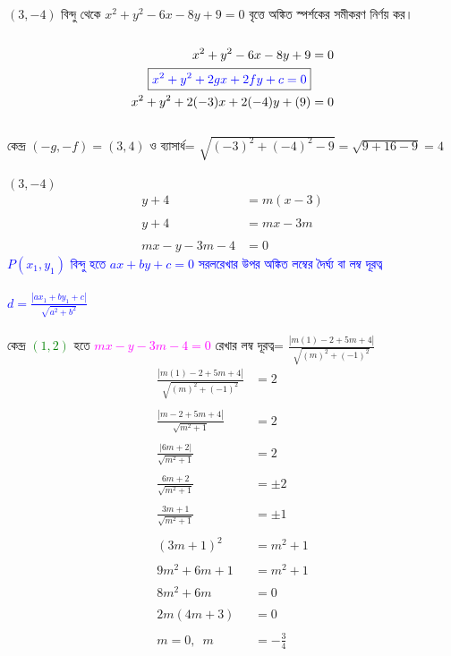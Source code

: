\documentclass{article}
\begin{document}
	\\ 
	$(3,-4)$ বিন্দু থেকে $x^2+y^2-6x-8y+9=0$ বৃত্তে অঙ্কিত স্পর্শকের সমীকরণ নির্ণয় কর। \\ 
	\\ 
	\begin{align*}
		x^2+y^2-6x-8y+9&=0\\
		\boxed{\textcolor{blue}{x^2+y^2+2gx+2fy+c=0}}&\\
		x^2+y^2+2(-3)x+2(-4)y+(9)&=0
	\end{align*}
	\\
	কেন্দ্র 	$(-g,-f)=(3,4)$ ও ব্যাসার্ধ= $\sqrt{(-3)^2+(-4)^2-9}=\sqrt{9+16-9}=4$\\
	\\ 
	$(3,-4)$
	\begin{align*}
		y+4&=m(x-3)\\
		\\
		y+4&=mx-3m\\
		\\
		mx-y-3m-4&=0
	\end{align*}
	\textcolor{blue}{$P(x_1,y_1)$ বিন্দু হতে  $ax+by+c=0$ সরলরেখার উপর অঙ্কিত লম্বের দৈর্ঘ্য বা লম্ব দূরত্ব \\
		\\
		$d=\frac{|ax_1+by_1+c|}{\sqrt{a^2+b^2}}$}\\
	\\
	কেন্দ্র \textcolor{green}{$(1,2)$} হতে \textcolor{magenta}{$mx-y-3m-4=0$}  রেখার লম্ব দূরত্ব= $	\frac{|m(1)-2+5m+4|}{\sqrt{(m)^2+(-1)^2}}$\\
	\begin{align*}
		\frac{|m(1)-2+5m+4|}{\sqrt{(m)^2+(-1)^2}}&=2\\
		\\
		\frac{|m-2+5m+4|}{\sqrt{m^2+1}}&=2\\
		\\
		\frac{|6m+2|}{\sqrt{m^2+1}}&=2\\
		\\
		\frac{6m+2}{\sqrt{m^2+1}}&=\pm 2\\
		\\
		\frac{3m+1}{\sqrt{m^2+1}}&=\pm 1\\
		\\
		(3m+1)^2&=m^2+1\\
		\\
		9m^2+6m+1&=m^2+1\\
		\\
		8m^2+6m&=0\\
		\\
		2m(4m+3)&=0\\
		\\
		m=0,\,\,\,m&=-\frac{3}{4}
	\end{align*}
\end{document}
